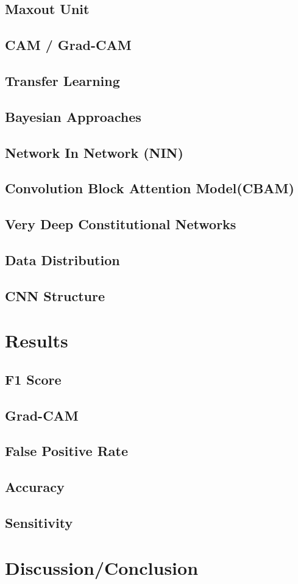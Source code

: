 \documentclass[acmsmall, review]{acmart}
\begin{document}
\subsection{Maxout Unit}
\subsection{CAM / Grad-CAM}
\subsection{Transfer Learning}
\subsection{Bayesian Approaches}
\subsection{Network In Network (NIN)}
\subsection{Convolution Block Attention Model(CBAM)}
\subsection{Very Deep Constitutional Networks}
\subsection{Data Distribution}
\subsection{CNN Structure}


\section{Results}
\subsection{F1 Score}
\subsection{Grad-CAM}
\subsection{False Positive Rate}
\subsection{Accuracy}
\subsection{Sensitivity}
\section{Discussion/Conclusion}
\end{document}
